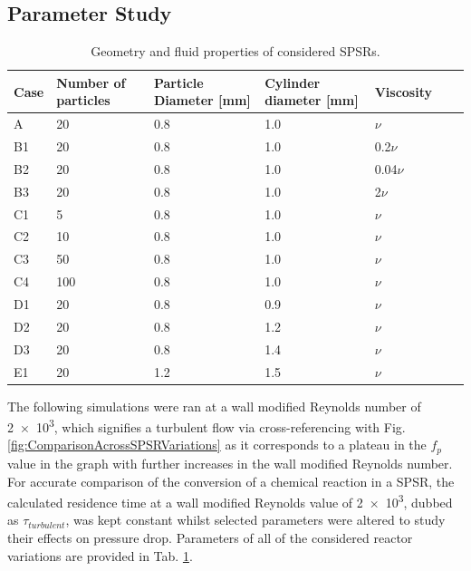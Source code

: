 \subsection{Parameter Study}
\begin{table}[H]
\caption{Geometry and fluid properties of considered SPSRs.}
\begin{tabular}{@{}lllllll@{}}
\midrule
Case & Number of particles & Particle Diameter {[}mm{]} & Cylinder diameter {[}mm{]} & Viscosity &  &  \\ \toprule
A    & 20                  & 0.8                        & 1.0                        & $\nu$        &  &  \\
B1   & 20                  & 0.8                        & 1.0                        & 0.2$\nu$     &  &  \\
B2   & 20                  & 0.8                        & 1.0                        & 0.04$\nu$    &  &  \\
B3   & 20                  & 0.8                        & 1.0                        & 2$\nu$       &  &  \\
C1   & 5                   & 0.8                        & 1.0                        & $\nu$        &  &  \\
C2   & 10                  & 0.8                        & 1.0                        & $\nu$        &  &  \\
C3   & 50                  & 0.8                        & 1.0                        & $\nu$        &  &  \\
C4   & 100                 & 0.8                        & 1.0                        & $\nu$        &  &  \\
D1   & 20                  & 0.8                        & 0.9                        & $\nu$        &  &  \\
D2   & 20                  & 0.8                        & 1.2                        & $\nu$        &  &  \\
D3   & 20                  & 0.8                        & 1.4                        & $\nu$        &  &  \\
E1   & 20                  & 1.2                        & 1.5                        & $\nu$        &  &  \\
\bottomrule
\end{tabular}
	\label{tab:TableOfParameters}
\end{table}
The following simulations were ran at a wall modified Reynolds number of \num{2e3}, which signifies a turbulent flow via cross-referencing with Fig. \ref{fig:ComparisonAcrossSPSRVariations} as it corresponds to a plateau in the $f_p$ value in the graph with further increases in the wall modified Reynolds number. For accurate comparison of the conversion of a chemical reaction in a SPSR, the calculated residence time at a wall modified Reynolds value of \num{2e3}, dubbed as $\tau_{turbulent}$, was kept constant whilst selected parameters were altered to study their effects on pressure drop. Parameters of all of the  considered reactor variations are provided in Tab. \ref{tab:TableOfParameters}.

